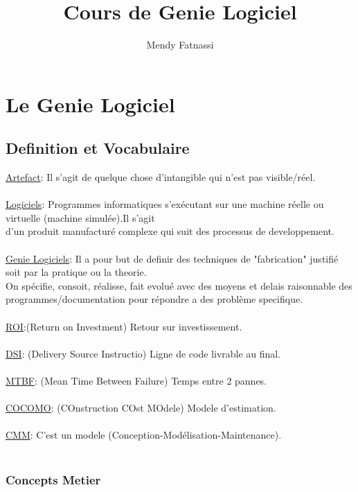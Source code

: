 \documentclass[a4paper,12pt,openany]{book}
\author{Mendy Fatnassi}
\title{Cours de Genie Logiciel}
\begin{document}
\maketitle
\tableofcontents

\chapter{Le Genie Logiciel}
\section{Definition et Vocabulaire}

\underline{Artefact}: Il s'agit de quelque chose d'intangible qui n'est pas visible/réel.\\
\\
\underline{Logiciels}: Programmes informatiques s’exécutant sur une machine réelle ou virtuelle (machine simulée).Il s'agit \\
d'un produit manufacturé complexe qui suit des processus de developpement.\\
\\
\underline{Genie Logiciels}: Il a pour but de definir des techniques de "fabrication" justifié soit par la pratique ou la theorie.\\
On spécifie, consoit, réalisse, fait evolué avec des moyens et delais raisonnable des programmes/documentation pour répondre a des problème specifique.\\
\\
\underline{ROI}:(Return on Investment) Retour sur investissement.\\
\\
\underline{DSI}: (Delivery Source Instructio) Ligne de code livrable au final.\\
\\
\underline{MTBF}: (Mean Time Between Failure) Temps entre 2 pannes.\\
\\
\underline{COCOMO}: (COnstruction COst MOdele) Modele d'estimation.\\
\\
\underline{CMM}: C'est un modele (Conception-Modélisation-Maintenance).\\
\\

\subsection{Concepts Metier}
\end{document}
